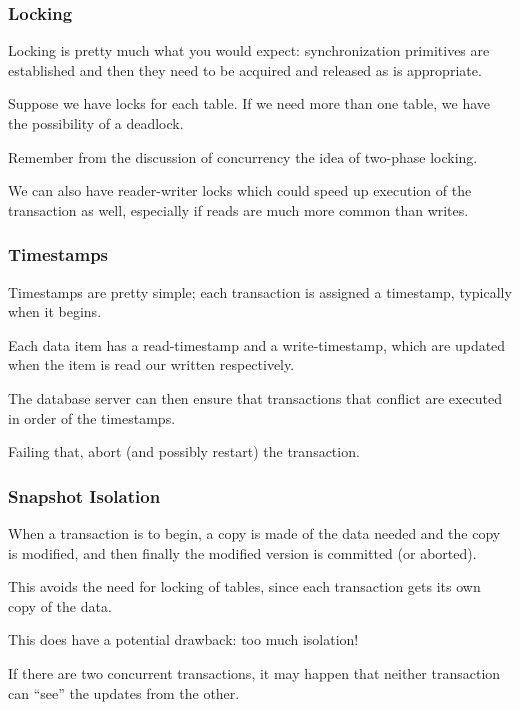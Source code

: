\begin{frame}
\frametitle{Locking}

Locking is pretty much what you would expect: synchronization primitives are established and then they need to be acquired and released as is appropriate.

Suppose we have locks for each table. If we need more than one table, we have the possibility of a deadlock. 

Remember from the discussion of concurrency the idea of two-phase locking. 


We can also have reader-writer locks which could speed up execution of the transaction as well, especially if reads are much more common than writes.

\end{frame}

\begin{frame}
\frametitle{Timestamps}

Timestamps are pretty simple; each transaction is assigned a timestamp, typically when it begins. 

Each data item has a read-timestamp and a write-timestamp, which are updated when the item is read our written respectively. 

The database server can then ensure that transactions that conflict are executed in order of the timestamps. 

Failing that, abort (and possibly restart) the transaction.


\end{frame}

\begin{frame}
\frametitle{Snapshot Isolation}
When a transaction is to begin, a copy is made of the data needed and the copy is modified, and then finally the modified version is committed (or aborted). 

This avoids the need for locking of tables, since each transaction gets its own copy of the data.

This does have a potential drawback: too much isolation! 

If there are two concurrent transactions, it may happen that neither transaction can ``see'' the updates from the other.

\end{frame}




